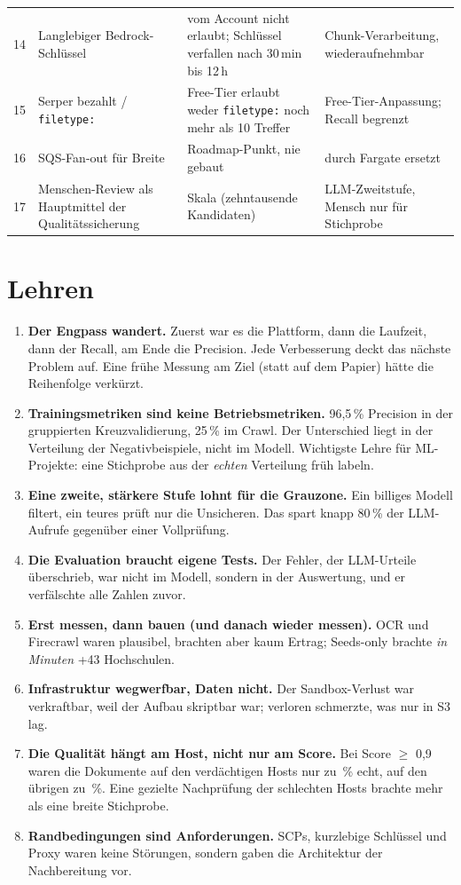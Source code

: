 \begin{table}[htbp]
\begin{tabularx}{\linewidth}{@{}p{0.5cm} p{3.4cm} p{3.6cm} X@{}}
14 & Langlebiger Bedrock-Schlüssel & vom Account nicht erlaubt; Schlüssel verfallen nach 30\,min bis 12\,h & Chunk-Verarbeitung, wiederaufnehmbar \\
15 & Serper bezahlt / \texttt{filetype:} & Free-Tier erlaubt weder \texttt{filetype:} noch mehr als 10 Treffer & Free-Tier-Anpassung; Recall begrenzt \\
16 & SQS-Fan-out für Breite & Roadmap-Punkt, nie gebaut & durch Fargate ersetzt \\
17 & Menschen-Review als Hauptmittel der Qualitätssicherung & Skala (zehntausende Kandidaten) & LLM-Zweitstufe, Mensch nur für Stichprobe \\
\bottomrule
\end{tabularx}
\end{table}

\section{Lehren}
\begin{enumerate}
  \item \textbf{Der Engpass wandert.} Zuerst war es die Plattform, dann die Laufzeit, dann der Recall, am Ende die Precision. Jede Verbesserung deckt das nächste Problem auf. Eine frühe Messung am Ziel (statt auf dem Papier) hätte die Reihenfolge verkürzt.
  \item \textbf{Trainingsmetriken sind keine Betriebsmetriken.} 96,5\,\% Precision in der gruppierten Kreuzvalidierung, 25\,\% im Crawl. Der Unterschied liegt in der Verteilung der Negativbeispiele, nicht im Modell. Wichtigste Lehre für ML-Projekte: eine Stichprobe aus der \emph{echten} Verteilung früh labeln.
  \item \textbf{Eine zweite, stärkere Stufe lohnt für die Grauzone.} Ein billiges Modell filtert, ein teures prüft nur die Unsicheren. Das spart knapp 80\,\% der LLM-Aufrufe gegenüber einer Vollprüfung.
  \item \textbf{Die Evaluation braucht eigene Tests.} Der Fehler, der LLM-Urteile überschrieb, war nicht im Modell, sondern in der Auswertung, und er verfälschte alle Zahlen zuvor.
  \item \textbf{Erst messen, dann bauen (und danach wieder messen).} OCR und Firecrawl waren plausibel, brachten aber kaum Ertrag; Seeds-only brachte \emph{in Minuten} +43 Hochschulen.
  \item \textbf{Infrastruktur wegwerfbar, Daten nicht.} Der Sandbox-Verlust war verkraftbar, weil der Aufbau skriptbar war; verloren schmerzte, was nur in S3 lag.
  \item \textbf{Die Qualität hängt am Host, nicht nur am Score.} Bei Score $\ge$ 0,9 waren die Dokumente auf den \zSuspectHosts{} verdächtigen Hosts nur zu \zSuspectPct\,\% echt, auf den übrigen zu \zNonSuspectPct\,\%. Eine gezielte Nachprüfung der schlechten Hosts brachte mehr als eine breite Stichprobe.
  \item \textbf{Randbedingungen sind Anforderungen.} SCPs, kurzlebige Schlüssel und Proxy waren keine Störungen, sondern gaben die Architektur der Nachbereitung vor.
\end{enumerate}

